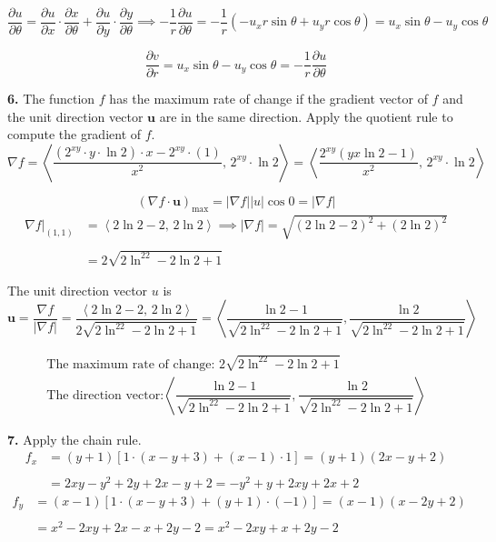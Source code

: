 \documentclass{article}
\begin{document}
\[\frac{\partial u}{\partial\theta}=\frac{\partial u}{\partial x}\cdot\frac{\partial x}{\partial\theta}+\frac{\partial u}{\partial y}\cdot\frac{\partial y}{\partial\theta}\implies-\frac1r\frac{\partial u}{\partial\theta}=-\frac1r\left(-u_x r\sin\theta+u_y r\cos\theta\right)=u_x\sin\theta-u_y\cos\theta\]

\[\frac{\partial v}{\partial r}=u_x\sin\theta-u_y\cos\theta=-\frac1r\frac{\partial u}{\partial \theta}\]

\vspace{1em}

\textbf{6.} The function $f$ has the maximum rate of change if the gradient vector of $f$ and the unit direction vector $\mathbf u$ are in the same direction. Apply the quotient rule to compute the gradient of $f$.
\[\nabla f=\left\langle\frac{\left(2^{xy}\cdot y\cdot\ln2\right)\cdot x-2^{xy}\cdot(1)}{x^2},\,2^{xy}\cdot\ln2\right\rangle=\left\langle\frac{2^{xy}\left(yx\ln2-1\right)}{x^2},\,2^{xy}\cdot\ln2\right\rangle\]

\[\left(\nabla f\cdot\mathbf u\right)_{\text{max}}=\left|\nabla f\right||u|\cos0=|\nabla f|\]
\begin{align*}\nabla f|_{(1,1)}&=\left\langle2\ln2-2,\,2\ln2\right\rangle\implies|\nabla f|=\sqrt{\left(2\ln2-2\right)^2+\left(2\ln2\right)^2}\\\\&=2\sqrt{2\ln^22-2\ln2+1}\end{align*}

The unit direction vector $u$ is
\[\mathbf{u}=\frac{\nabla f}{|\nabla f|}=\frac{\left\langle2\ln2-2,\,2\ln2\right\rangle}{2\sqrt{2\ln^22-2\ln2+1}}=\left\langle\frac{\ln2-1}{\sqrt{2\ln^22-2\ln2+1}},\frac{\ln2}{\sqrt{2\ln^22-2\ln2+1}}\right\rangle\]

\[\boxed{\begin{array}{c}\text{The maximum rate of change: }{2\sqrt{2\ln^22-2\ln2+1}}\\[1em]\text{The direction vector:}\left\langle\dfrac{\ln2-1}{\sqrt{2\ln^22-2\ln2+1}},\dfrac{\ln2}{\sqrt{2\ln^22-2\ln2+1}}\right\rangle\end{array}}\]

\vspace{1em}

\textbf{7.} Apply the chain rule.
\begin{align*}f_x&=(y+1)\left[1\cdot(x-y+3)+(x-1)\cdot1\right]=(y+1)(2x-y+2)\\\\&=2xy-y^2+2y+2x-y+2=-y^2+y+2xy+2x+2\end{align*}
\begin{align*}f_y&=(x-1)\left[1\cdot(x-y+3)+(y+1)\cdot(-1)\right]=(x-1)(x-2y+2)\\\\&=x^2-2xy+2x-x+2y-2=x^2-2xy+x+2y-2\end{align*}
\end{document}
